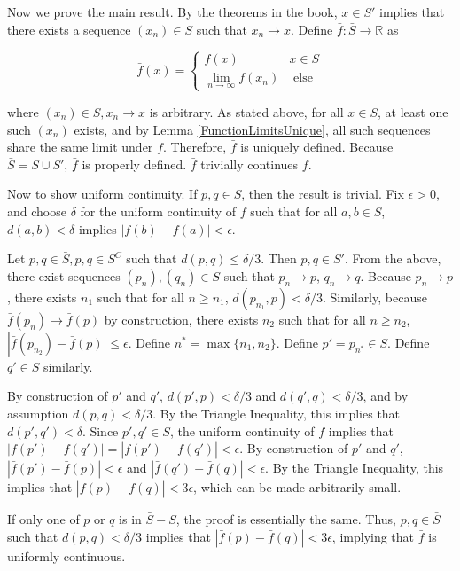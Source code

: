 \documentclass{article}
\newcommand{\R}{\mathbb{R}}
\begin{document}
Now we prove the main result. By the theorems in the book, $x \in S'$ implies that there exists a sequence $(x_n) \in S$ such that $x_n \rightarrow x$. Define $\bar{f}: \bar{S} \rightarrow \R$ as

\[
\bar{f}(x) = 
\begin{cases}
f(x) & x \in S \\
\lim_{n \rightarrow \infty} f(x_n) & \text{ else}
\end{cases}
\]

where $(x_n) \in S, x_n \rightarrow x$ is arbitrary. As stated above, for all $x \in S$, at least one such $(x_n)$ exists, and by Lemma \ref{FunctionLimitsUnique}, all such sequences share the same limit under $f$. Therefore, $\bar{f}$ is uniquely defined. Because $\bar{S} = S \cup S'$, $\bar{f}$ is properly defined. $\bar{f}$ trivially continues $f$.

Now to show uniform continuity. If $p, q \in S$, then the result is trivial. Fix $\epsilon > 0$, and choose $\delta$ for the uniform continuity of $f$ such that for all $a, b \in S$, $d(a, b) < \delta$ implies $|f(b) - f(a)| < \epsilon$.

Let $p, q \in \bar{S}, p, q \in S^C$ such that $d(p, q) \leq \delta/3$. Then $p, q \in S'$. From the above, there exist sequences $(p_n), (q_n) \in S$ such that $p_n \rightarrow p$, $q_n \rightarrow q$. Because $p_n \rightarrow p$, there exists $n_1$ such that for all $n \geq n_1$, $d(p_{n_1}, p) < \delta/3$. Similarly, because $\bar{f}(p_n) \rightarrow \bar{f}(p)$ by construction, there exists $n_2$ such that for all $n \geq n_2$, $|\bar{f}(p_{n_2}) - \bar{f}(p)| \leq \epsilon$. Define $n^* = \max\{n_1, n_2\}$. Define $p' = p_{n^*} \in S$. Define $q' \in S$ similarly.

By construction of $p'$ and $q'$, $d(p', p) < \delta/3$ and $d(q', q) < \delta/3$, and by assumption $d(p, q) < \delta/3$. By the Triangle Inequality, this implies that $d(p', q') < \delta$. Since $p', q' \in S$, the uniform continuity of $f$ implies that $|f(p') - f(q')| = |\bar{f}(p') - \bar{f}(q')| < \epsilon$. By construction of $p'$ and $q'$, $|\bar{f}(p') - \bar{f}(p)| < \epsilon$ and $|\bar{f}(q') - \bar{f}(q)| < \epsilon$. By the Triangle Inequality, this implies that $|\bar{f}(p) - \bar{f}(q)| < 3\epsilon$, which can be made arbitrarily small.

If only one of $p$ or $q$ is in $\bar{S} - S$, the proof is essentially the same. Thus, $p, q \in \bar{S}$ such that $d(p, q) < \delta/3$ implies that $|\bar{f}(p) - \bar{f}(q)| < 3\epsilon$, implying that $\bar{f}$ is uniformly continuous.
\end{document}
